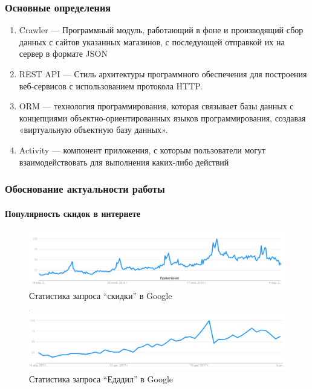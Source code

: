 \documentclass{beamer}
\begin{document}
\begin{frame}
\frametitle{Основные определения}
	\begin{enumerate}
        \item Crawler --- Программный модуль, работающий в фоне и производящий
              сбор данных с сайтов указанных магазинов, с последующей отправкой
              их на сервер в формате JSON
        \item REST API --- Стиль архитектуры программного обеспечения для
              построения веб-сервисов с использованием протокола HTTP.
        \item ORM --- технология программирования, которая связывает базы
              данных с концепциями объектно-ориентированных языков программирования,
              создавая «виртуальную объектную базу данных».
        \item Activity --- компонент приложения, с
              которым пользователи могут взаимодействовать для выполнения
              каких-либо действий
	\end{enumerate}
\end{frame}

\begin{frame}[c]
    \frametitle{Обоснование актуальности работы}
    \framesubtitle{Популярность скидок в интернете}
    \begin{figure}
        \includegraphics[width=\columnwidth]{trend.png}
        \caption{Статистика запроса ``скидки'' в Google}
    \end{figure}
    \begin{figure}
        \includegraphics[width=\columnwidth]{trend_edadeal.png}
        \caption{Статистика запроса ``Едадил'' в Google}
    \end{figure}
\end{frame}
\end{document}

